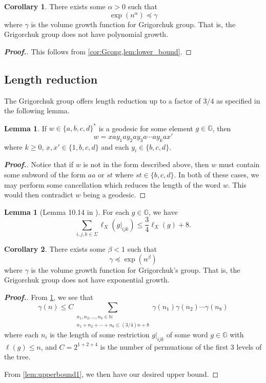 \documentclass[11pt,a4paper,reqno]{amsart}
\theoremstyle{plain}
\theoremstyle{definition}
\newtheorem{lemma}[theorem]{Lemma}
\newtheorem{corollary}{Corollary}[theorem]
\theoremstyle{definition}
\newenvironment{myproof}{\begin{proof}[\normalfont\bfseries Proof.]}{\end{proof}}
\renewcommand\leq\leqslant
\renewcommand\geq\geqslant
\begin{document}
\begin{corollary}\label{cor:lower_bound}
  There exists some $\alpha>0$ such that
  \[
    \exp(n^\alpha) \preccurlyeq \gamma
  \]
  where $\gamma$ is the volume growth function for Grigorchuk group.
  That is, the Grigorchuk group does not have polynomial growth.
\end{corollary}

\begin{myproof}
  This follows from \cref{cor:Gcong,lem:lower_bound}.
\end{myproof}

\subsection{Length reduction}

The Grigorchuk group offers length reduction up to a factor of $3/4$ as specified in the following lemma.

\begin{lemma}\label{lem:alternating_form}
  If $w \in \{a,b,c,d\}^*$ is a geodesic for some element $g\in \mathbb G$, then
  \[
    w = 
    x a y_1 a y_2 a y_3 a\cdots a y_k a x'
  \]
  where $k \geq 0$, $x,x' \in \{1,b,c,d\}$ and each $y_i\in \{b,c,d\}$.
\end{lemma}
\begin{myproof}
  Notice that if $w$ is not in the form described above, then $w$ must contain some subword of the form $aa$ or $st$ where $st\in \{b,c,d\}$.
  In both of these cases, we may perform some cancellation which reduces the length of the word $w$.
  This would then contradict $w$ being a geodesic.
\end{myproof}


\begin{lemma}[Lemma 10.14 in \cite{Mann}]\label{lem:34red}
  For each $g\in \mathbb G$, we have
  \[
    \sum_{i,j,k\in \Sigma}
    \ell_X(g|_{ijk})
    \leq
    \frac{3}{4}
    \ell_X(g) + 8.
  \]
\end{lemma}

\begin{corollary}\label{cor:upper_bound}
  There exists some $\beta < 1$ such that
  \[
    \gamma \preccurlyeq \exp(n^\beta)
  \]
  where $\gamma$ is the volume growth function for Grigorchuk's group.
  That is, the Grigorchuk group does not have exponential growth.
\end{corollary}

\begin{myproof}
  From \cref{lem:34red}, we see that
  \[
    \gamma(n)
    \leq
    C
    \sum_{\substack{n_1,n_2,\ldots,n_8\in \mathbb N\\ n_1 + n_2 + \cdots +n_8 \leq (3/4)n+8}}
    \gamma(n_1)\gamma(n_2)\cdots \gamma(n_8)
  \]
  where each $n_i$ is the length of some restriction $g|_{ijk}$ of some word $g\in \mathbb G$ with $\ell(g)\leq n$,
  and $C = 2^{1+2+4}$ is the number of permuations of the first 3 levels of the tree.

  From \cref{lem:upperbound1}, we then have our desired upper bound.
\end{myproof}
\end{document}
